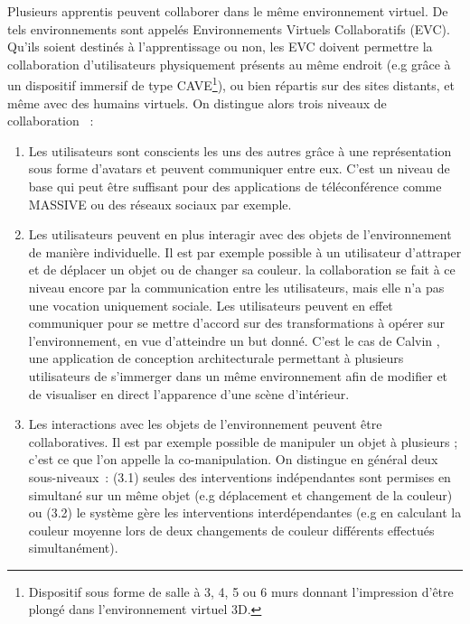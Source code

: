 \documentclass[11pt]{article}
\begin{document}
Plusieurs apprentis peuvent collaborer dans le même environnement virtuel. De tels environnements sont appelés Environnements Virtuels Collaboratifs (EVC). Qu'ils soient destinés à l'apprentissage ou non, les EVC doivent permettre la collaboration d'utilisateurs physiquement présents au même endroit (e.g grâce à un dispositif immersif de type CAVE\footnote{Dispositif sous forme de salle à 3, 4, 5 ou 6 murs donnant l'impression d'être plongé dans l'environnement virtuel 3D.}), ou bien répartis sur des sites distants, et même avec des humains virtuels. On distingue alors trois niveaux de collaboration \cite{margery}~:
\begin{enumerate}
	\item Les utilisateurs sont conscients les uns des autres grâce à une représentation sous forme d'avatars et peuvent communiquer entre eux. C'est un niveau de base qui peut être suffisant pour des applications de téléconférence comme MASSIVE \cite{massive} ou des réseaux sociaux par exemple.
	\item Les utilisateurs peuvent en plus interagir avec des objets de l'environnement de manière individuelle. Il est par exemple possible à un utilisateur d'attraper et de déplacer un objet ou de changer sa couleur. la collaboration se fait à ce niveau encore par la communication entre les utilisateurs, mais elle n'a pas une vocation uniquement sociale. Les utilisateurs peuvent en effet communiquer pour se mettre d'accord sur des transformations à opérer sur l'environnement, en vue d'atteindre un but donné. C'est le cas de Calvin \cite{calvin}, une application de conception architecturale permettant à plusieurs utilisateurs de s'immerger dans un même environnement afin de modifier et de visualiser en direct l'apparence d'une scène d'intérieur.
	\item Les interactions avec les objets de l'environnement peuvent être collaboratives. Il est par exemple possible de manipuler un objet à plusieurs ; c'est ce que l'on appelle la co-manipulation. On distingue en général deux sous-niveaux~: (3.1) seules des interventions indépendantes sont permises en simultané sur un même objet (e.g déplacement et changement de la couleur) ou (3.2) le système gère les interventions interdépendantes (e.g en calculant la couleur moyenne lors de deux changements de couleur différents effectués simultanément).
\end{enumerate}
\end{document}
